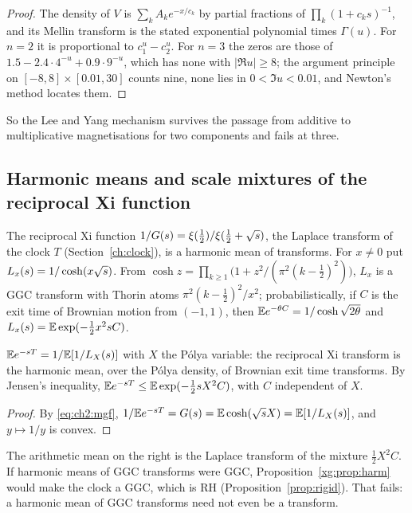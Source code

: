 \begin{proof}
The density of $V$ is $\sum_kA_ke^{-x/c_k}$ by partial fractions of $\prod_k(1+c_ks)^{-1}$, and its Mellin transform is the stated exponential polynomial times $\Gamma(u)$. For $n=2$ it is proportional to $c_1^u-c_2^u$. For $n=3$ the zeros are those of $1.5-2.4\cdot4^{-u}+0.9\cdot9^{-u}$, which has none with $|\Re u|\ge8$; the argument principle on $[-8,8]\times[0.01,30]$ counts nine, none lies in $0<\Im u<0.01$, and Newton's method locates them.
\end{proof}

So the Lee and Yang mechanism survives the passage from additive to multiplicative magnetisations for two components and fails at three.

\subsection{Harmonic means and scale mixtures of the reciprocal Xi function}\label{sec:xg:kernel}

The reciprocal Xi function $1/G(s)=\xi(\frac12)/\xi(\frac12+\sqrt{s})$, the Laplace transform of the clock $T$ (Section~\ref{ch:clock}), is a harmonic mean of transforms. For $x\ne0$ put $L_x(s)=1/\cosh(x\sqrt{s})$. From $\cosh z=\prod_{k\ge1}\big(1+z^2/(\pi^2(k-\frac12)^2)\big)$, $L_x$ is a GGC transform with Thorin atoms $\pi^2(k-\frac12)^2/x^2$; probabilistically, if $C$ is the exit time of Brownian motion from $(-1,1)$, then $\mathbb{E} e^{-\theta C}=1/\cosh\sqrt{2\theta}$ and $L_x(s)=\mathbb{E}\exp(-\frac12x^2sC)$.

\begin{proposition}\label{xg:prop:harm}
$\mathbb{E} e^{-sT}=1/\mathbb{E}[1/L_X(s)]$ with $X$ the P\'olya variable: the reciprocal Xi transform is the harmonic mean, over the P\'olya density, of Brownian exit time transforms. By Jensen's inequality, $\mathbb{E} e^{-sT}\le\mathbb{E}\exp(-\frac12sX^2C)$, with $C$ independent of $X$.
\end{proposition}

\begin{proof}
By \eqref{eq:ch2:mgf}, $1/\mathbb{E} e^{-sT}=G(s)=\mathbb{E}\cosh(\sqrt{s} X)=\mathbb{E}[1/L_X(s)]$, and $y\mapsto1/y$ is convex.
\end{proof}

The arithmetic mean on the right is the Laplace transform of the mixture $\frac12X^2C$. If harmonic means of GGC transforms were GGC, Proposition~\ref{xg:prop:harm} would make the clock a GGC, which is RH (Proposition~\ref{prop:rigid}). That fails: a harmonic mean of GGC transforms need not even be a transform.

